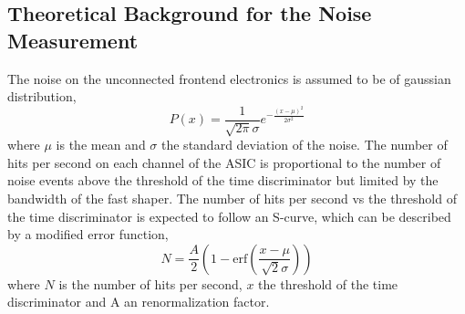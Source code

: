 \subsection{Theoretical Background for the Noise Measurement} \label{sec:noise_theory}
The noise on the unconnected frontend electronics is assumed to be of gaussian distribution,
\begin{equation}
    P(x) = \frac{1}{\sqrt{2\pi}\sigma}e^{-\frac{(x-\mu)^2}{2\sigma^2}}
\end{equation}
where $\mu$ is the mean and $\sigma$ the standard deviation of the noise.\autocite{Theorynoise}
\newline
The number of hits per second on each channel of the ASIC is proportional to the number of noise events above the threshold of the time discriminator but limited by the bandwidth of the fast shaper.\autocite{Theorynoise}
\newline
The number of hits per second vs the threshold of the time discriminator is expected to follow an S-curve, which can be described by a modified error function,
\begin{equation}
    N = \frac{A}{2} \left( 1 - \text{erf} \left( \frac{x - \mu}{\sqrt{2}\sigma} \right) \right)
\end{equation}
where $N$ is the number of hits per second, $x$ the threshold of the time discriminator and A an renormalization factor.\autocite{Theorynoise}